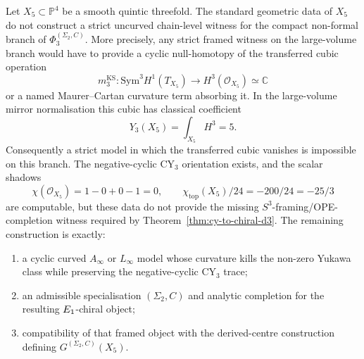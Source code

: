 \begin{theorem}
\label{thm:cy-c-beyond-quintic-strictification-obstruction}
Let $X_5 \subset \mathbb P^4$ be a smooth quintic threefold. The standard
geometric data of $X_5$ do not construct a strict uncurved
chain-level witness for the compact non-formal branch of
$\Phi_3^{(\Sigma_2,C)}$. More precisely, any strict framed witness on the
large-volume branch would have to provide a cyclic null-homotopy of the
transferred cubic operation
\[
 m^{\mathrm{KS}}_3 :
 \mathrm{Sym}^3 H^1(T_{X_5}) \longrightarrow
 H^3(\mathcal O_{X_5}) \simeq \mathbb C
\]
or a named Maurer--Cartan curvature term absorbing it. In the
large-volume mirror normalisation this cubic has classical coefficient
\[
 Y_3(X_5) = \int_{X_5} H^3 = 5.
\]
Consequently a strict model in which the transferred cubic vanishes is
impossible on this branch. The negative-cyclic CY$_3$ orientation
exists, and the scalar shadows
\[
 \chi(\mathcal O_{X_5}) = 1-0+0-1=0,\qquad
 \chi_{\mathrm{top}}(X_5)/24=-200/24=-25/3
\]
are computable, but these data do not provide the missing
$S^3$-framing/OPE-completion witness required by
Theorem~\ref{thm:cy-to-chiral-d3}. The remaining construction is
exactly:
\begin{enumerate}[label=\textup{(\roman*)}]
 \item a cyclic curved $A_\infty$ or $L_\infty$ model whose curvature
 kills the non-zero Yukawa class while preserving the
 negative-cyclic CY$_3$ trace;
 \item an admissible specialisation $(\Sigma_2,C)$ and analytic
 completion for the resulting $E_{1}$-chiral object;
 \item compatibility of that framed object with the derived-centre
 construction defining $G^{(\Sigma_2,C)}(X_5)$.
\end{enumerate}
\end{theorem}

